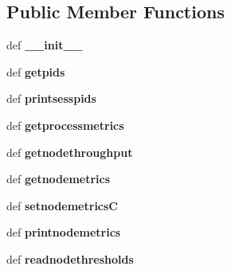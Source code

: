 \subsection*{Public Member Functions}
\begin{DoxyCompactItemize}
\item 
\hypertarget{classperflogserver_1_1_log_session_af99e03f4b6f9adac2fbfaeb439de433f}{def {\bfseries \+\_\+\+\_\+init\+\_\+\+\_\+}}\label{classperflogserver_1_1_log_session_af99e03f4b6f9adac2fbfaeb439de433f}

\item 
\hypertarget{classperflogserver_1_1_log_session_a04aeb030dc08852a37215584bec70cbb}{def {\bfseries getpids}}\label{classperflogserver_1_1_log_session_a04aeb030dc08852a37215584bec70cbb}

\item 
\hypertarget{classperflogserver_1_1_log_session_a3d17da01cb84eee1aebfc9f0c273103b}{def {\bfseries printsesspids}}\label{classperflogserver_1_1_log_session_a3d17da01cb84eee1aebfc9f0c273103b}

\item 
\hypertarget{classperflogserver_1_1_log_session_a8583d4a2fc9054472638fae76fdc47f1}{def {\bfseries getprocessmetrics}}\label{classperflogserver_1_1_log_session_a8583d4a2fc9054472638fae76fdc47f1}

\item 
\hypertarget{classperflogserver_1_1_log_session_a8cf5cd6c8a4098192f51be753ae03025}{def {\bfseries getnodethroughput}}\label{classperflogserver_1_1_log_session_a8cf5cd6c8a4098192f51be753ae03025}

\item 
\hypertarget{classperflogserver_1_1_log_session_a583a41132d55c09e8d078b16fc05d915}{def {\bfseries getnodemetrics}}\label{classperflogserver_1_1_log_session_a583a41132d55c09e8d078b16fc05d915}

\item 
\hypertarget{classperflogserver_1_1_log_session_a5b2f6a86a6e1cf0022078ed6bb9e156c}{def {\bfseries setnodemetrics\+C}}\label{classperflogserver_1_1_log_session_a5b2f6a86a6e1cf0022078ed6bb9e156c}

\item 
\hypertarget{classperflogserver_1_1_log_session_a24d3b0fa771417c79238c507d8b8deee}{def {\bfseries printnodemetrics}}\label{classperflogserver_1_1_log_session_a24d3b0fa771417c79238c507d8b8deee}

\item 
\hypertarget{classperflogserver_1_1_log_session_a395dd1f9ffded7873e314e5b7eef592e}{def {\bfseries readnodethresholds}}\label{classperflogserver_1_1_log_session_a395dd1f9ffded7873e314e5b7eef592e}


\end{DoxyCompactItemize}
